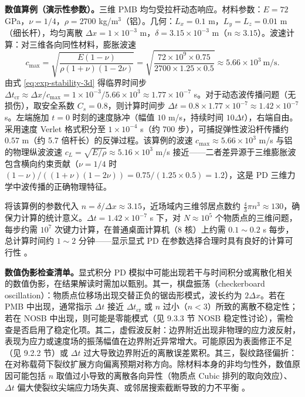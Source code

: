 \textbf{数值算例（演示性参数）。}三维 PMB 均匀受拉杆动态响应。材料参数：$E=72$ GPa，$\nu=1/4$，$\rho=2700$ kg/m$^3$（铝）。几何：$L_x=0.1$ m，$L_y=L_z=0.01$ m（细长杆），均匀离散 $\Delta x=1\times10^{-3}$ m，$\delta=3.15\times10^{-3}$ m（$n\approx3.15$）。波速计算：对三维各向同性材料，膨胀波速
\begin{equation}
  c_{\max}
  =\sqrt{\frac{E(1-\nu)}{\rho(1+\nu)(1-2\nu)}}
  =\sqrt{\frac{72\times10^{9}\times0.75}{2700\times1.25\times0.5}}
  \approx5.66\times10^{3}\ \text{m/s}.
  \label{eq:exp-num-wave}
\end{equation}
由式 \eqref{eq:exp-stability-3d} 得临界时间步 $\Delta t_{\text{cr}}\approx\Delta x/c_{\max}=1\times10^{-3}/5.66\times10^{3}\approx1.77\times10^{-7}$ s。对于动态波传播问题（无损伤），取安全系数 $C_s=0.8$，则计算时间步 $\Delta t=0.8\times1.77\times10^{-7}\approx1.42\times10^{-7}$ s。左端施加 $t=0$ 时刻的速度脉冲（幅值 $10$ m/s，持续时间 $10\Delta t$），右端自由。采用速度 Verlet 格式积分至 $1\times10^{-4}$ s（约 700 步），可捕捉弹性波沿杆传播约 $0.57$ m（约 5.7 倍杆长）的反弹过程。该算例的波速 $c_{\max}\approx5.66\times10^{3}$ m/s 与铝的物理纵波波速 $c_L=\sqrt{E/\rho}\approx5.16\times10^{3}$ m/s 接近——二者差异源于三维膨胀波包含横向约束贡献（$\nu=1/4$ 时 $(1-\nu)/((1+\nu)(1-2\nu))=0.75/(1.25\times0.5)=1.2$），这是 PD 三维力学中波传播的正确物理特征。

将该算例的参数代入 $n=\delta/\Delta x\approx3.15$，近场域内三维邻居点数约 $\frac{4}{3}\pi n^3\approx130$，确保力计算的统计意义。$\Delta t=1.42\times10^{-7}$ s 下，对 $N\approx10^5$ 个物质点的三维问题，每步约需 $10^7$ 次键力计算，在普通桌面计算机（8 核）上约需 $0.1\sim0.2$ s 每步，总计算时间约 $1\sim2$ 分钟——显示显式 PD 在参数选择合理时具有良好的计算可行性 \cite{Parks2008}。

\textbf{数值伪影检查清单。}显式积分 PD 模拟中可能出现若干与时间积分或离散化相关的数值伪影，在结果解读时需加以甄别。其一，棋盘振荡（checkerboard oscillation）：物质点位移场出现交替正负的锯齿形模式，波长约为 $2\Delta x$。若在 PMB 中出现，通常指示 $\Delta t$ 接近 $\Delta t_{\text{cr}}$ 或 $n$ 过小（$n<3$）所致的离散不稳定性；若在 NOSB 中出现，则可能是零能模式（见 9.3.3 节 NOSB 稳定性讨论），需检查是否启用了稳定化项。其二，虚假波反射：边界附近出现非物理的应力波反射，表现为应力或速度场的振荡幅值在边界附近异常增大。可能原因为表面修正不足（见 9.2.2 节）或 $\Delta t$ 过大导致边界附近的离散误差累积。其三，裂纹路径偏折：在对称载荷下裂纹扩展方向偏离预期对称方向。除材料本身的非均匀性外，数值原因可能包括 $n$ 取值过小导致的离散各向异性（物质点 Cubic 排列的取向效应）、$\Delta t$ 偏大使裂纹尖端应力场失真、或邻居搜索截断导致的力不平衡 \cite{Diehl2019,HuHaBobaru2012}。

